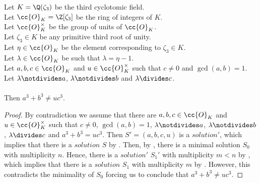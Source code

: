 \begin{theorem}
  \label{thm:fermatLastTheoremForThreeGen}
  \leanok
  Let $K = \Q(\zeta_3)$ be the third cyclotomic field. \\
  Let $\cc{O}_K = \Z[\zeta_3]$ be the ring of integers of $K$. \\
  Let $\cc{O}^\times_K$ be the group of units of $\cc{O}_K$. \\
  Let $\zeta_3 \in K$ be any primitive third root of unity. \\
  Let $\eta \in \cc{O}_K$ be the element corresponding to $\zeta_3 \in K$. \\
  Let $\lambda \in \cc{O}_K$ be such that $\lambda = \eta -1$. \\
  Let $a, b, c \in \cc{O}_K$ and $u \in \cc{O}^\times_K$ such that $c \neq 0$ and $\gcd(a,b)=1$.\\
  Let $\lambda \notdivides a$, $\lambda \notdivides b$ and $\lambda \divides c$. \\\\
  Then $a^3 + b^3 \neq u c^3$.
\end{theorem}
\begin{proof}
  \leanok
  By contradiction we assume that there are $a, b, c \in \cc{O}_K$ and $u \in \cc{O}^\times_K$
  such that $c \neq 0$, $\gcd(a,b)=1$, $\lambda \notdivides a$, $\lambda \notdivides b$,
  $\lambda \divides c$ and $a^3 + b^3 = u c^3$.
  Then $S'=(a,b,c,u)$ is a $solution'$, which implies that there is a $solution$ $S$ by
  .
  Then, by , there is a minimal solution $S_0$ with multiplicity $n$.
  Hence, there is a $solution'$ $S_1'$ with multiplicity $m<n$ by ,
  which implies that there is a $solution$ $S_1$  with multiplicity $m$ by .
  However, this contradicts the minimality of $S_0$
  forcing us to conclude that $a^3 + b^3 \neq u c^3$.
\end{proof}

